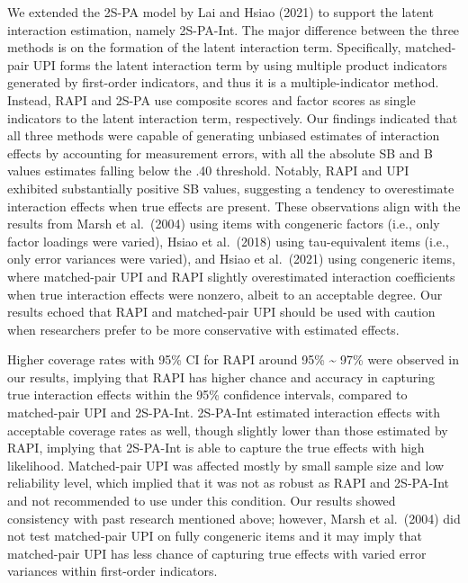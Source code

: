 \documentclass[
  man]{apa6}
\begin{document}
We extended the 2S-PA model by Lai and Hsiao (2021) to support the latent interaction estimation, namely 2S-PA-Int.
The major difference between the three methods is on the formation of the latent interaction term. Specifically, matched-pair UPI forms the latent interaction term by using multiple product indicators generated by first-order indicators, and thus it is a multiple-indicator method. Instead, RAPI and 2S-PA use composite scores and factor scores as single indicators to the latent interaction term, respectively. Our findings indicated that all three methods were capable of generating unbiased estimates of interaction effects by accounting for measurement errors, with all the absolute SB and B values estimates falling below the .40 threshold. Notably, RAPI and UPI exhibited substantially positive SB values, suggesting a tendency to overestimate interaction effects when true effects are present. These observations align with the results from Marsh et al.~(2004) using items with congeneric factors (i.e., only factor loadings were varied), Hsiao et al.~(2018) using tau-equivalent items (i.e., only error variances were varied), and Hsiao et al.~(2021) using congeneric items, where matched-pair UPI and RAPI slightly overestimated interaction coefficients when true interaction effects were nonzero, albeit to an acceptable degree. Our results echoed that RAPI and matched-pair UPI should be used with caution when researchers prefer to be more conservative with estimated effects.

Higher coverage rates with 95\% CI for RAPI around 95\% \textasciitilde{} 97\% were observed in our results, implying that RAPI has higher chance and accuracy in capturing true interaction effects within the 95\% confidence intervals, compared to matched-pair UPI and 2S-PA-Int. 2S-PA-Int estimated interaction effects with acceptable coverage rates as well, though slightly lower than those estimated by RAPI, implying that 2S-PA-Int is able to capture the true effects with high likelihood. Matched-pair UPI was affected mostly by small sample size and low reliability level, which implied that it was not as robust as RAPI and 2S-PA-Int and not recommended to use under this condition. Our results showed consistency with past research mentioned above; however, Marsh et al.~(2004) did not test matched-pair UPI on fully congeneric items and it may imply that matched-pair UPI has less chance of capturing true effects with varied error variances within first-order indicators.
\end{document}
